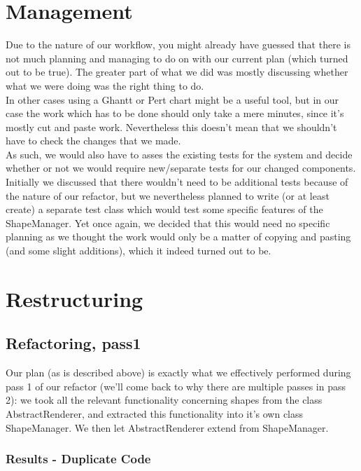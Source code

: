 \documentclass{article}
\begin{document}
\section{Management}

Due to the nature of our workflow, you might already have guessed that there is not much planning and managing to do on with our current plan (which turned out to be true). The greater part of what we did was mostly discussing whether what we were doing was the right thing to do.\\

In other cases using a Ghantt or Pert chart might be a useful tool, but in our case the work which has to be done should only take a mere minutes, since it's mostly cut and paste work. Nevertheless this doesn't mean that we shouldn't have to check the changes that we made.\\

As such, we would also have to asses the existing tests for the system and decide whether or not we would require new/separate tests for our changed components. Initially we discussed that there wouldn't need to be additional tests because of the nature of our refactor, but we nevertheless planned to write (or at least create) a separate test class which would test some specific features of the ShapeManager. Yet once again, we decided that this would need no specific planning as we thought the work would only be a matter of copying and pasting (and some slight additions), which it indeed turned out to be.

\section{Restructuring}

\subsection{Refactoring, pass1}

Our plan (as is described above) is exactly what we effectively performed during pass 1 of our refactor (we'll come back to why there are multiple passes in pass 2): we took all the relevant functionality concerning shapes from the class AbstractRenderer, and extracted this functionality into it's own class ShapeManager. We then let AbstractRenderer extend from ShapeManager.

\subsubsection{Results - Duplicate Code}
\end{document}
